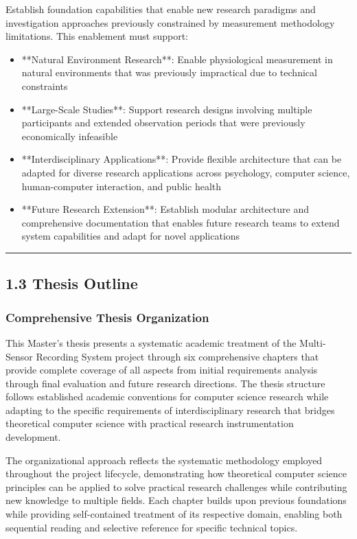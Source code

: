 \documentclass[12pt,a4paper]{article}
\begin{document}
Establish foundation capabilities that enable new research paradigms and investigation approaches previously constrained
by measurement methodology limitations. This enablement must support:

\begin{itemize}
\item **Natural Environment Research**: Enable physiological measurement in natural environments that was previously
  impractical due to technical constraints
\item **Large-Scale Studies**: Support research designs involving multiple participants and extended observation periods
  that were previously economically infeasible
\item **Interdisciplinary Applications**: Provide flexible architecture that can be adapted for diverse research
  applications across psychology, computer science, human-computer interaction, and public health
\item **Future Research Extension**: Establish modular architecture and comprehensive documentation that enables future
  research teams to extend system capabilities and adapt for novel applications

\end{itemize}
\hrule

\subsection{1.3 Thesis Outline}

\subsubsection{Comprehensive Thesis Organization}

This Master's thesis presents a systematic academic treatment of the Multi-Sensor Recording System project through six
comprehensive chapters that provide complete coverage of all aspects from initial requirements analysis through final
evaluation and future research directions. The thesis structure follows established academic conventions for computer
science research while adapting to the specific requirements of interdisciplinary research that bridges theoretical
computer science with practical research instrumentation development.

The organizational approach reflects the systematic methodology employed throughout the project lifecycle, demonstrating
how theoretical computer science principles can be applied to solve practical research challenges while contributing new
knowledge to multiple fields. Each chapter builds upon previous foundations while providing self-contained treatment of
its respective domain, enabling both sequential reading and selective reference for specific technical topics.
\end{document}

